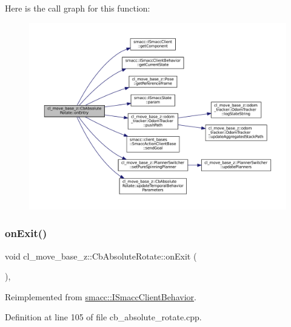 Here is the call graph for this function\+:
\nopagebreak
\begin{figure}[H]
\begin{center}
\leavevmode
\includegraphics[width=350pt]{classcl__move__base__z_1_1CbAbsoluteRotate_a10418ea360809fa649d295716b152b2b_cgraph}
\end{center}
\end{figure}
\mbox{\label{classcl__move__base__z_1_1CbAbsoluteRotate_a0e362b8e9f0d7de5aeee183ba4031437}} 
\subsubsection{\texorpdfstring{on\+Exit()}{onExit()}}
{\footnotesize\ttfamily void cl\+\_\+move\+\_\+base\+\_\+z\+::\+Cb\+Absolute\+Rotate\+::on\+Exit (\begin{DoxyParamCaption}{ }\end{DoxyParamCaption})\hspace{0.3cm}{\ttfamily [override]}, {\ttfamily [virtual]}}



Reimplemented from \hyperlink{classsmacc_1_1ISmaccClientBehavior_a36bf771905e3bf750909a15e4215a9b3}{smacc\+::\+I\+Smacc\+Client\+Behavior}.



Definition at line 105 of file cb\+\_\+absolute\+\_\+rotate.\+cpp.



